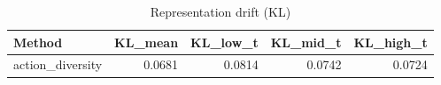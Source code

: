 \begin{table}[htbp]
\centering
\caption{Representation drift (KL)}
\label{tab:repr-drift}
\begin{tabular}{lrrrr}
\toprule
\textbf{Method} & \textbf{KL\_mean} & \textbf{KL\_low\_t} & \textbf{KL\_mid\_t} & \textbf{KL\_high\_t} \\
\midrule
action\_diversity & 0.0681 & 0.0814 & 0.0742 & 0.0724 \\
\bottomrule
\end{tabular}
\end{table}